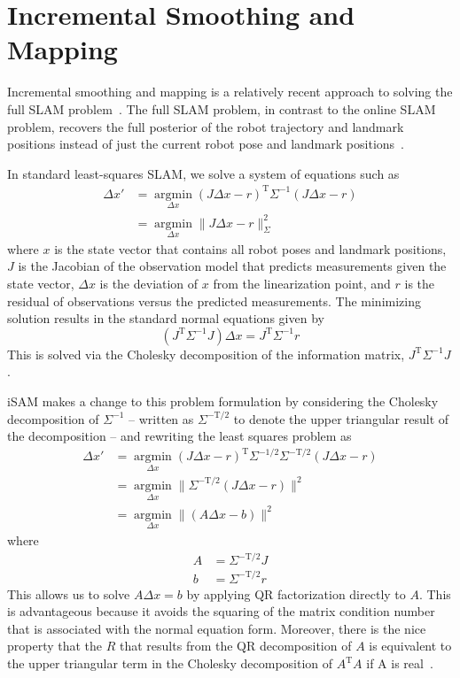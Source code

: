 \documentclass[conference]{IEEEtran}
\begin{document}
\section{Incremental Smoothing and Mapping}
\label{sec:incrementalsmoothingandmapping}


Incremental smoothing and mapping is a relatively recent approach to solving the
full \ac{SLAM} problem~\cite{Kaess08tro}.  The full \ac{SLAM} problem, in contrast to the
online \ac{SLAM} problem, recovers the full posterior of the robot trajectory and landmark
positions instead of just the current robot pose and landmark
positions~\cite{thrun2005probabilistic}.

In standard least-squares \ac{SLAM}, we solve a system of equations such as
\begin{align*}
  \Delta x' &= \underset{\Delta x}{\operatorname{argmin}} (J\Delta x - r)^{\text{T}}
\Sigma^{-1} (J\Delta x - r) \\
  &= \underset{\Delta x}{\operatorname{argmin}} \| J\Delta x - r \|^2_{\Sigma}
\end{align*}
where $x$ is the state vector that contains all robot poses and
landmark positions, $J$ is the Jacobian of the observation model that
predicts measurements given the state vector, $\Delta x$ is the
deviation of $x$ from the linearization point, and $r$ is the residual
of observations versus the predicted measurements. The minimizing
solution results in the standard normal equations given by
\[
(J^{\text{T}} \Sigma^{-1} J) \Delta x = J^{\text{T}} \Sigma^{-1}r
\]
This is solved via the Cholesky decomposition of the information matrix,
$J^{\text{T}}\Sigma^{-1}J$.

iSAM makes a change to this problem formulation by considering the Cholesky decomposition
of $\Sigma^{-1}$ -- written as $\Sigma^{-\text{T}/2}$ to denote the upper triangular
result of the decomposition --  and rewriting the least squares problem as
\begin{align*}
    \Delta x' &= \underset{\Delta x}{\operatorname{argmin}} (J\Delta x - r)^{\text{T}}
\Sigma^{-1/2}\Sigma^{-\text{T}/2} (J\Delta x - r) \\
  &= \underset{\Delta x}{\operatorname{argmin}} \| \Sigma^{-\text{T}/2}(J\Delta x - r)
  \|^2\\
&= \underset{\Delta x}{\operatorname{argmin}} \| (A\Delta x - b)\|^2
\end{align*}
where
\begin{align*}
  A &= \Sigma^{-\text{T}/2}J \\
  b &= \Sigma^{-\text{T}/2}r
\end{align*}
This allows us to solve $A\Delta x = b$ by applying QR factorization directly to $A$. This
is advantageous because it avoids the squaring of the matrix condition number that is
associated with the normal equation form. Moreover, there is the nice property that the
$R$ that results from the QR decomposition of $A$ is equivalent to the upper triangular
term in the Cholesky decomposition of $A^{\text{T}}A$ if A is real~\cite{Kaess08tro}.
\end{document}
